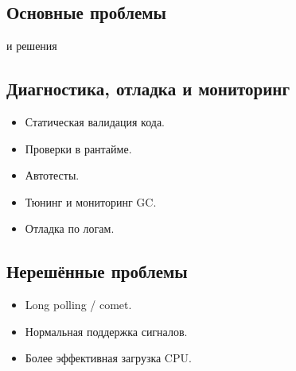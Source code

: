 \documentclass[aspectratio=169,handout,bigger]{beamer}
\begin{document}
\subsection*{Основные проблемы}

\begin{frame}
  \begin{center}и решения\end{center}
\end{frame}


\subsection*{Диагностика, отладка и мониторинг}

\begin{frame}
  \begin{itemize}
    \item Статическая валидация кода.
    \item Проверки в рантайме.
    \item Автотесты.
    \item Тюнинг и мониторинг GC.
    \item Отладка по логам.
  \end{itemize}
\end{frame}



\subsection*{Нерешённые проблемы}

\begin{frame}
  \begin{itemize}
    \item Long polling / comet.
    \item Нормальная поддержка сигналов.
    \item Более эффективная загрузка CPU.
  \end{itemize}
\end{frame}

\end{document}
